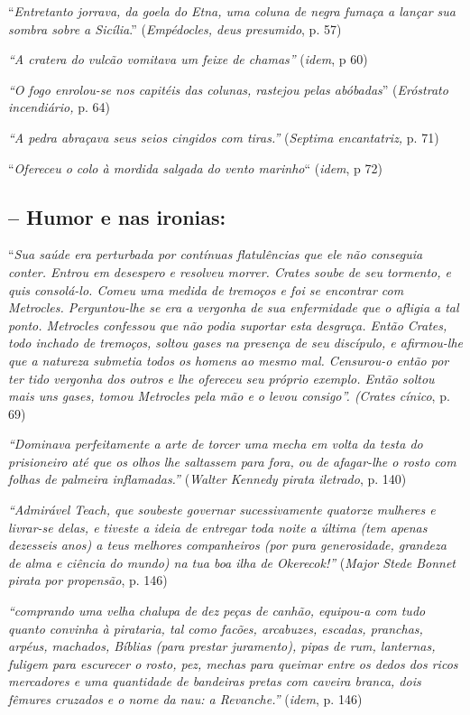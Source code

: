 \documentclass[12pt]{extarticle}
\begin{document}
``\emph{Entretanto jorrava, da goela do Etna, uma coluna de negra fumaça
a lançar sua sombra sobre a Sicília}.'' (\emph{Empédocles, deus
presumido}, p. 57)

\emph{``A cratera do vulcão vomitava um feixe de chamas''} (\emph{idem},
p 60)

\emph{``O fogo enrolou-se nos capitéis das colunas, rastejou pelas
abóbadas}'' (\emph{Eróstrato incendiário,} p. 64)

\emph{``A pedra abraçava seus seios cingidos com tiras.''}
(\emph{Septima encantatriz,} p. 71)

``\emph{Ofereceu o colo à mordida salgada do vento marinho}``
(\emph{idem}, p 72)

\subsection{-- Humor e nas ironias:}

``\emph{Sua saúde era perturbada por contínuas flatulências que ele não
conseguia conter. Entrou em desespero e resolveu morrer. Crates soube de
seu tormento, e quis consolá-lo. Comeu uma medida de tremoços e foi se
encontrar com Metrocles. Perguntou-lhe se era a vergonha de sua
enfermidade que o afligia a tal ponto. Metrocles confessou que não podia
suportar esta desgraça. Então Crates, todo inchado de tremoços, soltou
gases na presença de seu discípulo, e afirmou-lhe que a natureza
submetia todos os homens ao mesmo mal. Censurou-o então por ter tido
vergonha dos outros e lhe ofereceu seu próprio exemplo. Então soltou
mais uns gases, tomou Metrocles pela mão e o levou consigo''. (Crates
cínico}, p. 69)

\emph{``Dominava perfeitamente a arte de torcer uma mecha em volta da
testa do prisioneiro até que os olhos lhe saltassem para fora, ou de
afagar-lhe o rosto com folhas de palmeira inflamadas.''} (\emph{Walter
Kennedy pirata iletrado}, p. 140)

\emph{``Admirável Teach, que soubeste governar sucessivamente quatorze
mulheres e livrar-se delas, e tiveste a ideia de entregar toda noite a
última (tem apenas dezesseis anos) a teus melhores companheiros (por
pura generosidade, grandeza de alma e ciência do mundo) na tua boa ilha
de Okerecok!''} (\emph{Major Stede Bonnet pirata por propensão}, p. 146)

\emph{``comprando uma velha chalupa de dez peças de canhão, equipou-a
com tudo quanto convinha à pirataria, tal como facões, arcabuzes,
escadas, pranchas, arpéus, machados, Bíblias (para prestar juramento),
pipas de rum, lanternas, fuligem para escurecer o rosto, pez, mechas
para queimar entre os dedos dos ricos mercadores e uma quantidade de
bandeiras pretas com caveira branca, dois fêmures cruzados e o nome da
nau: a Revanche.''} (\emph{idem}, p. 146)
\end{document}
